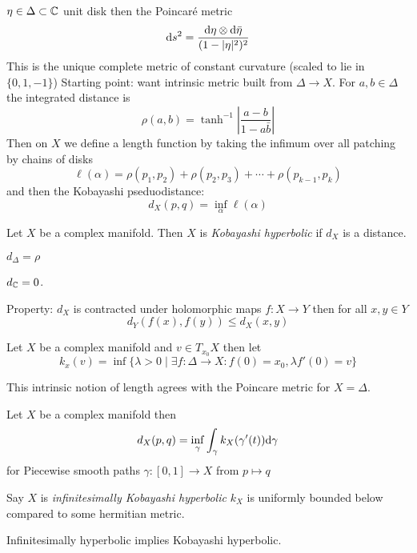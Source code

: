 \documentclass[12pt]{article}
\begin{document}
$\eta \in \Delta \subset \mathbb{C}$ unit disk then the Poincar\'{e} metric 
\[ \mathrm{d}{s}^2 = \frac{\mathrm{d}{\eta} \otimes \mathrm{d}{\bar{\eta}}}{(1 - |\eta|^2)^2} \]
This is the unique complete metric of constant curvature (scaled to lie in $\{ 0, 1, - 1\}$)
Starting point: want intrinsic metric built from $\Delta \to X$. For $a, b \in \Delta$ the integrated distance is
\[ \rho(a,b) = \tanh^{-1} \left| \frac{a - b}{1 - a \bar{b}} \right| \]
Then on $X$ we define a length function by taking the infimum over all patching by chains of disks 
\[ \ell(\alpha) = \rho(p_1, p_2) + \rho(p_2, p_3) + \cdots + \rho(p_{k-1}, p_k) \]
and then the Kobayashi pseduodistance:
\[ d_X(p,q) = \inf_\alpha \ell(\alpha) \]

\begin{defn}
Let $X$ be a complex manifold. Then $X$ is \textit{Kobayashi hyperbolic} if $d_X$ is a distance.
\end{defn}

\begin{lemma}
$d_\Delta = \rho$
\end{lemma}

\begin{rmk}
$d_{\mathbb{C}} = 0$.
\end{rmk}

Property: $d_X$ is contracted under holomorphic maps $f : X \to Y$ then for all $x, y \in Y$
\[ d_Y(f(x), f(y)) \le d_X(x,y) \]

\begin{defn}
Let $X$ be a complex manifold and $v \in T_{x_0} X$ then let
\[ k_x(v) = \inf \{ \lambda > 0 \mid \exists f : \Delta \to X : f(0) = x_0, \lambda f'(0) = v \} \]
\end{defn}

This intrinsic notion of length agrees with the Poincare metric for $X = \Delta$.

\begin{theorem}[Royden]
Let $X$ be a complex manifold then 
\[ d_X(p,q) = \inf_\gamma \int_\gamma k_X(\gamma'(t)) \mathrm{d}{\gamma} \]
for Piecewise smooth paths $\gamma : [0,1] \to X$ from $p \mapsto q$
\end{theorem}

\begin{defn}
Say $X$ is \textit{infinitesimally Kobayashi hyperbolic} $k_X$ is uniformly bounded below compared to some hermitian metric. 
\end{defn}

\begin{cor}
Infinitesimally hyperbolic implies Kobayashi hyperbolic.
\end{cor}
\end{document}

